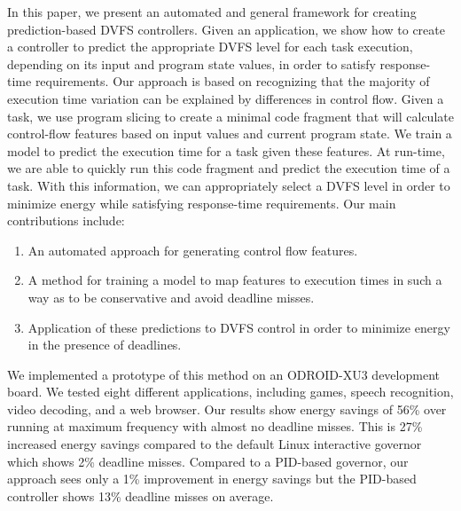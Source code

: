 In this paper, we present an automated and general framework for creating
prediction-based DVFS controllers. Given an application, we show how to create
a controller to predict the appropriate DVFS level for each task execution,
depending on its input and program state values, in order to satisfy
response-time requirements. Our approach is based on recognizing that the
majority of execution time variation can be explained by differences in control
flow.
Given a task, we use program slicing to create a minimal code fragment that
will calculate control-flow features based on input values and current program
state. We train a model to predict the execution time for a task given these
features. At run-time, we are able to quickly run this code fragment and
predict the execution time of a task. With this information, we can
appropriately select a DVFS level in order to minimize energy while satisfying
response-time requirements.
Our main contributions include:
\begin{enumerate}
  \item An automated approach for generating control flow features.
  \item A method for training a model to map features to execution times in
  such a way as to be conservative and avoid deadline misses.
  \item Application of these predictions to DVFS control in order to minimize energy
  in the presence of deadlines.
\end{enumerate}

We implemented a prototype of this method on an ODROID-XU3 development board.
We tested eight different applications, including games,
speech recognition, video decoding, and a web browser. Our results show energy savings of 56\%
over running at maximum frequency with almost no deadline misses. This is
27\% increased energy savings compared to the
default Linux interactive governor which shows 2\% deadline misses.
Compared to a PID-based governor, our
approach sees only a 1\% improvement in energy savings but the PID-based
controller shows 13\% deadline misses on average.

